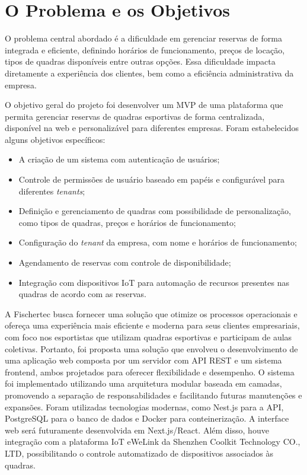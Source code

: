 \section{O Problema e os Objetivos}

O problema central abordado é a dificuldade em gerenciar reservas de forma integrada e eficiente, definindo horários de funcionamento, preços de locação, tipos de quadras disponíveis entre outras opções. Essa dificuldade impacta diretamente a experiência dos clientes, bem como a eficiência administrativa da empresa.

O objetivo geral do projeto foi desenvolver um \gls{MVP} de uma plataforma que permita gerenciar reservas de quadras esportivas de forma centralizada, disponível na web e personalizável para diferentes empresas. Foram estabelecidos alguns objetivos específicos:

\begin{itemize}
    \item A criação de um sistema com autenticação de usuários;
    \item Controle de permissões de usuário baseado em papéis e configurável para diferentes \textit{tenants};
    \item Definição e gerenciamento de quadras com possibilidade de personalização, como tipos de quadras, preços e horários de funcionamento;
    \item Configuração do \textit{tenant} da empresa, com nome e horários de funcionamento;
    \item Agendamento de reservas com controle de disponibilidade;
    \item Integração com dispositivos IoT para automação de recursos presentes nas quadras de acordo com as reservas.
\end{itemize}

A Fischertec busca fornecer uma solução que otimize os processos operacionais e ofereça uma experiência mais eficiente e moderna para seus clientes empresariais, com foco nos esportistas que utilizam quadras esportivas e participam de aulas coletivas. Portanto, foi proposta uma solução que envolveu o desenvolvimento de uma aplicação web composta por um servidor com API REST e um sistema frontend, ambos projetados para oferecer flexibilidade e desempenho. O sistema foi implementado utilizando uma arquitetura modular baseada em camadas, promovendo a separação de responsabilidades e facilitando futuras manutenções e expansões. Foram utilizadas tecnologias modernas, como Nest.js para a API, PostgreSQL para o banco de dados e Docker para conteinerização. A interface web será futuramente desenvolvida em Next.js/React. Além disso, houve integração com a plataforma IoT eWeLink da Shenzhen Coolkit Technology CO., LTD, possibilitando o controle automatizado de dispositivos associados às quadras.

